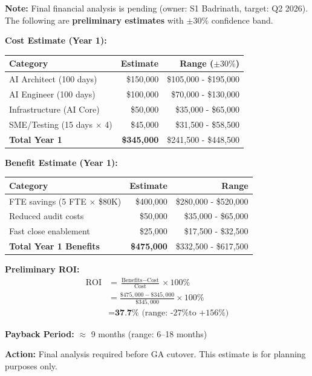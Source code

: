 \begin{tcolorbox}[colback=yellow!10,colframe=yellow!50!black,title=\faIcon{exclamation-triangle} G-001: Financial Analysis - Preliminary Estimates]

\textbf{Note:} Final financial analysis is pending (owner: S1 Badrinath, target: Q2 2026).
The following are \textbf{preliminary estimates} with $\pm 30\%$ confidence band.

\vspace{0.5em}
\textbf{Cost Estimate (Year 1):}
\begin{tabular}{lrr}
\toprule
\textbf{Category} & \textbf{Estimate} & \textbf{Range ($\pm 30\%$)} \\
\midrule
AI Architect (100 days) & \$150,000 & \$105,000 - \$195,000 \\
AI Engineer (100 days) & \$100,000 & \$70,000 - \$130,000 \\
Infrastructure (AI Core) & \$50,000 & \$35,000 - \$65,000 \\
SME/Testing (15 days $\times$ 4) & \$45,000 & \$31,500 - \$58,500 \\
\midrule
\textbf{Total Year 1} & \textbf{\$345,000} & \$241,500 - \$448,500 \\
\bottomrule
\end{tabular}

\textbf{Benefit Estimate (Year 1):}
\begin{tabular}{lrr}
\toprule
\textbf{Category} & \textbf{Estimate} & \textbf{Range} \\
\midrule
FTE savings (5 FTE $\times$ \$80K) & \$400,000 & \$280,000 - \$520,000 \\
Reduced audit costs & \$50,000 & \$35,000 - \$65,000 \\
Fast close enablement & \$25,000 & \$17,500 - \$32,500 \\
\midrule
\textbf{Total Year 1 Benefits} & \textbf{\$475,000} & \$332,500 - \$617,500 \\
\bottomrule
\end{tabular}

\textbf{Preliminary ROI:}
\begin{align*}
\text{ROI} &= \frac{\text{Benefits} - \text{Cost}}{\text{Cost}} \times 100\% \\
&= \frac{\$475,000 - \$345,000}{\$345,000} \times 100\% \\
&= \textbf{37.7\%} \text{ (range: -27\% to +156\%)}
\end{align*}

\textbf{Payback Period:} $\approx$ 9 months (range: 6--18 months)

\vspace{0.5em}
\textbf{Action:} Final analysis required before GA cutover. This estimate is 
for planning purposes only.
\end{tcolorbox}

